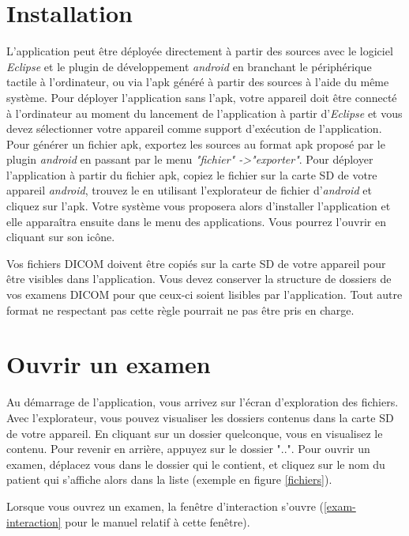 \section{Installation}

L'application peut être déployée directement à partir des sources avec le logiciel \emph{Eclipse} et le plugin de développement \emph{android} en branchant le périphérique tactile à l'ordinateur, ou via l'apk généré à partir des sources à l'aide du même système. Pour déployer l'application sans l'apk, votre appareil doit être connecté à l'ordinateur au moment du lancement de l'application à partir d'\emph{Eclipse} et vous devez sélectionner votre appareil comme support d'exécution de l'application. Pour générer un fichier apk, exportez les sources au format apk proposé par le plugin \emph{android} en passant par le menu \emph{"fichier"
->"exporter"}. Pour déployer l'application à partir du fichier apk, copiez le fichier sur la carte SD de votre appareil \emph{android}, trouvez le en utilisant l'explorateur de fichier d'\emph{android} et cliquez sur l'apk. Votre système vous proposera alors d'installer l'application et elle apparaîtra ensuite dans le menu des applications. Vous pourrez l'ouvrir en cliquant sur son icône.

\begin{note}
Vos fichiers DICOM doivent être copiés sur la carte SD de votre appareil pour être visibles dans l'application. Vous devez conserver la structure de dossiers de vos examens DICOM pour que ceux-ci soient lisibles par l'application. Tout autre format ne respectant pas cette règle pourrait ne pas être pris en charge.
\end{note}

\section{Ouvrir un examen}

Au démarrage de l'application, vous arrivez sur l'écran d'exploration des fichiers. Avec l'explorateur, vous pouvez visualiser les dossiers contenus dans la carte SD de votre appareil. En cliquant sur un dossier quelconque, vous en visualisez le contenu. Pour revenir en arrière, appuyez sur le dossier "..". Pour ouvrir un examen, déplacez vous dans le dossier qui le contient, et cliquez sur le nom du patient qui s'affiche alors dans la liste (exemple en figure \vref{fichiers}).

Lorsque vous ouvrez un examen, la fenêtre d'interaction s'ouvre (\vref{exam-interaction} pour le manuel relatif à cette fenêtre).

